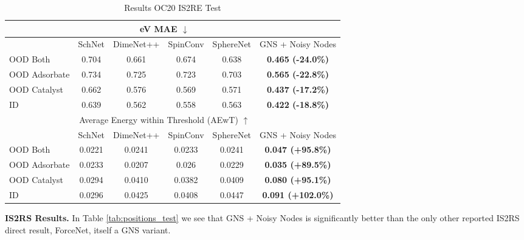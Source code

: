 \documentclass{article} \usepackage{iclr2022_conference,times}
\begin{document}
\begin{table}
\caption{Results OC20 IS2RE Test}
    \label{is2re_test}
    \centering
    \begin{tabular}{lccccc}
      \toprule
            &  \multicolumn{4}{c}{eV MAE $\downarrow$} \\
      \midrule
        & SchNet & DimeNet++ & SpinConv &  SphereNet & GNS + Noisy Nodes\\
      \midrule
      OOD Both & 0.704 & 0.661 & 0.674 & 0.638 & \textbf{0.465 (-24.0\%)} \\ 
      OOD Adsorbate & 0.734 & 0.725 & 0.723 & 0.703  & \textbf{0.565 (-22.8\%)}\\
      OOD Catalyst & 0.662 & 0.576 & 0.569 & 0.571  & \textbf{0.437 (-17.2\%)}\\
      ID & 0.639 & 0.562 & 0.558 & 0.563  & \textbf{0.422 (-18.8\%)}\\
      \midrule
          &  \multicolumn{4}{c}{Average Energy within Threshold (AEwT) $\uparrow$} \\
      \midrule
        & SchNet & DimeNet++ & SpinConv & SphereNet  & GNS + Noisy Nodes\\
      \midrule
      OOD Both & 0.0221 & 0.0241 & 0.0233 & 0.0241  & \textbf{0.047 (+95.8\%)} \\ 
      OOD Adsorbate & 0.0233 & 0.0207 & 0.026 & 0.0229  & \textbf{0.035 (+89.5\%)}\\
      OOD Catalyst & 0.0294 & 0.0410 & 0.0382 & 0.0409  & \textbf{0.080 (+95.1\%)}\\
      ID & 0.0296 & 0.0425 & 0.0408 & 0.0447 & \textbf{0.091 (+102.0\%)}\\
      \bottomrule
\end{tabular}
\end{table}

\textbf{IS2RS Results.}  In Table \ref{tab:positions_test} we see that GNS + Noisy Nodes is significantly better than the only other reported IS2RS direct result, ForceNet, itself a GNS variant.


\begin{table}
\captionsetup{justification=centering}
\caption{OC20 IS2RS Validation, ADwT, $\uparrow$}
\label{table_2_our_performance_positions_validation}
\centering
{}
\end{table}
\end{document}
